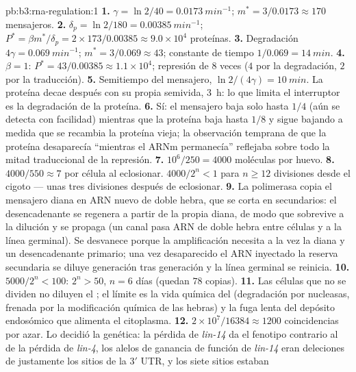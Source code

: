 \begin{solution}{pb:b3:rna-regulation:1}
\textbf{1.} $\gamma = \ln 2/40 = \qty{0.0173}{min^{-1}}$; $m^{*} =
3/0.0173 \approx 170$ mensajeros.
\textbf{2.} $\delta_{p} = \ln 2/180 = \qty{0.00385}{min^{-1}}$; $P^{*} =
\beta m^{*}/\delta_{p} = 2\times 173/0.00385 \approx 9.0\times 10^{4}$
proteínas.
\textbf{3.} Degradación $4\gamma = \qty{0.069}{min^{-1}}$; $m^{*} = 3/0.069
\approx 43$; constante de tiempo $1/0.069 = \qty{14}{min}$.
\textbf{4.} $\beta = 1$: $P^{*} = 43/0.00385 \approx 1.1\times 10^{4}$;
represión de $8$ veces ($4$ por la degradación, $2$ por la traducción).
\textbf{5.} Semitiempo del mensajero, $\ln 2/(4\gamma) = \qty{10}{min}$.
La proteína decae después con su propia semivida, \qty{3}{h}: lo que
limita el interruptor es la degradación de la proteína.
\textbf{6.} Sí: el mensajero baja solo hasta $1/4$ (aún se detecta con
facilidad) mientras que la proteína baja hasta $1/8$ y sigue bajando a
medida que se recambia la proteína vieja; la observación temprana de que
la proteína desaparecía ``mientras el ARNm permanecía'' reflejaba sobre
todo la mitad traduccional de la represión.
\textbf{7.} $10^{6}/250 = 4000$ moléculas por huevo.
\textbf{8.} $4000/550 \approx 7$ por célula al eclosionar. $4000/2^{n} < 1$
para $n \ge 12$ divisiones desde el cigoto --- unas tres divisiones
después de eclosionar.
\textbf{9.} La polimerasa copia el mensajero diana en ARN nuevo de doble
hebra, que se corta en  secundarios: el desencadenante se regenera a
partir de la propia diana, de modo que sobrevive a la dilución y se
propaga (un canal pasa ARN de doble hebra entre células y a la línea
germinal). Se desvanece porque la amplificación necesita a la vez la
diana y un desencadenante primario; una vez desaparecido el ARN inyectado
la reserva secundaria se diluye generación tras generación y la línea
germinal se reinicia.
\textbf{10.} $5000/2^{n} < 100$: $2^{n} > 50$, $n = 6$ días (quedan $78$
copias).
\textbf{11.} Las células que no se dividen no diluyen el ; el límite
es la vida química del  (degradación por nucleasas, frenada por la
modificación química de las hebras) y la fuga lenta del depósito
endosómico que alimenta el citoplasma.
\textbf{12.} $2\times 10^{7}/\num{16384} \approx \num{1200}$
coincidencias por azar. Lo decidió la genética: la pérdida de
\emph{lin-14} da el fenotipo contrario al de la pérdida de \emph{lin-4},
los alelos de ganancia de función de \emph{lin-14} eran deleciones de
justamente los sitios de la 3$'$ UTR, y los siete sitios estaban

\end{solution}
